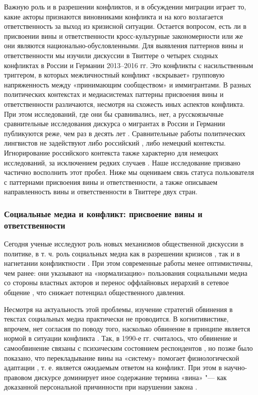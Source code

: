 Важную роль и в разрешении конфликтов, и в обсуждении миграции играет то, какие акторы признаются виновниками конфликта и на кого возлагается ответственность за выход из кризисной ситуации. Остается вопросом, есть ли в присвоении вины и ответственности кросс-культурные закономерности или же они являются национально-обусловленными. Для выявления паттернов вины и ответственности мы изучили дискуссии в Твиттере о четырех сходных конфликтах в России и Германии 2013–2016 гг. Это конфликты с насильственным триггером, в которых межличностный конфликт «вскрывает» групповую напряженность между «принимающим сообществом» и иммигрантами. В разных политических контекстах и медиасистемах паттерны присвоения вины и ответственности различаются, несмотря на схожесть иных аспектов конфликта. При этом исследований, где они бы сравнивались, нет, а русскоязычные сравнительные исследования дискурса о мигрантах в России и Германии публикуются реже, чем раз в десять лет \cite{Malakhov,Svinkina,Didenko}. Сравнительные работы политических лингвистов не задействуют либо российский \cite{NesterovaBurova}, либо немецкий \cite{Kalygina} контексты. Игнорирование российского контекста также характерно для немецких исследований, за исключением редких случаев \cite{Pottker}. Наше исследование призвано частично восполнить этот пробел. Ниже мы оцениваем связь статуса пользователя с паттернами присвоения вины и ответственности, а также описываем направленность вины и ответственности в Твиттере двух стран.

\subsubsection{Социальные медиа и конфликт: присвоение вины и ответственности}

Сегодня ученые исследуют роль новых механизмов общественной дискуссии в политике, в т. ч. роль социальных медиа как в разрешении кризисов \cite{Patrona}, так и в нагнетании конфликтности \cite{HeverinZach}. При этом современные работы менее оптимистичны, чем ранее: они указывают на «нормализацию» пользования социальными медиа со стороны властных акторов \cite{LasorsaLewisHolton} и перенос оффлайновых иерархий в сетевое общение \cite{Daniels}, что снижает потенциал общественного давления.

Несмотря на актуальность этой проблемы, изучение стратегий обвинения в текстах социальных медиа практически не проводится. В когнитивистике, впрочем, нет согласия по поводу того, насколько обвинение в принципе является нормой в ситуации конфликта \cite{PisarevaGritsenko}. Так, в 1990-е гг. считалось, что обвинение и самообвинение связаны с психическим состоянием респондентов \cite{TennenAffleck}, но позже было показано, что перекладывание вины на «систему» помогает физиологической адаптации \cite{LaVeistSellersNeighbors}, т. е. является ожидаемым ответом на конфликт. При этом в научно-правовом дискурсе доминирует иное содержание термина «вина» "--- как доказанной персональной причинности при нарушении закона \cite{Dmitrieva}.

